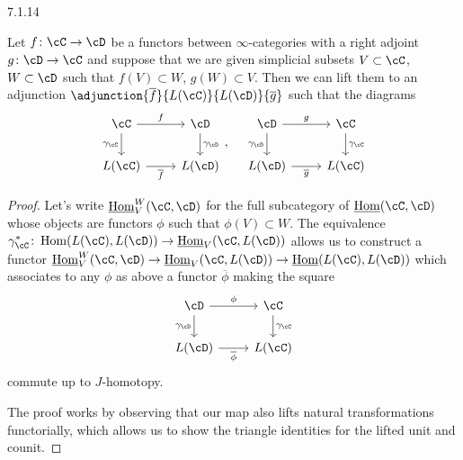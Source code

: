 \documentclass[a4paper,12pt]{scrartcl}
\begin{document}
\begin{prop}\label{7114}
  7.1.14

  Let $f\colon\cC\rightarrow\cD$ be a functors between $\infty$-categories with
  a right adjoint $g\colon\cD\rightarrow\cC$ and suppose that we are given
  simplicial subsets $V\subset\cC$, $W\subset\cD$ such that $f(V)\subset W$,
  $g(W)\subset V$. Then we can lift them to an adjunction
  $\adjunction{\overline{f}}{L(\cC)}{L(\cD)}{\overline{g}}$ such that the
  diagrams
  \[\begin{tikzcd}
    \cC & \cD \\
    {L(\cC)} & {L(\cD)}
    \arrow["{\gamma_\cD}", from=1-2, to=2-2]
    \arrow["{\gamma_\cC}"', from=1-1, to=2-1]
    \arrow["{\overline{f}}"', from=2-1, to=2-2]
    \arrow["f", from=1-1, to=1-2]
  \end{tikzcd},
  \quad
  \begin{tikzcd}
    \cD & \cC \\
    {L(\cD)} & {L(\cC)}
    \arrow["{\gamma_\cC}", from=1-2, to=2-2]
    \arrow["{\gamma_\cD}"', from=1-1, to=2-1]
    \arrow["{\overline{g}}"', from=2-1, to=2-2]
    \arrow["g", from=1-1, to=1-2]
  \end{tikzcd}
  \]
\end{prop}
\begin{proof}
  Let's write $\Home_V^W(\cC,\cD)$ for the full subcategory of $\Home(\cC,\cD)$
  whose objects are functors $\phi$ such that $\phi(V)\subset W$. The
  equivalence
  $\gamma^*_\cC\colon\Hom(L(\cC),L(\cD))\rightarrow\Home_V(\cC,L(\cD))$ allows
  us to construct a functor
  $\Home^W_V(\cC,\cD)\rightarrow\Home_V(\cC,L(\cD))\rightarrow\Home(L(\cC),L(\cD))$
  which associates to any $\phi$ as above a functor $\overline{\phi}$ making the
  square
  \[\begin{tikzcd}
    \cD & \cC \\
    {L(\cD)} & {L(\cC)}
    \arrow["{\gamma_\cC}", from=1-2, to=2-2]
    \arrow["{\gamma_\cD}"', from=1-1, to=2-1]
    \arrow["{\overline{\phi}}"', from=2-1, to=2-2]
    \arrow["\phi", from=1-1, to=1-2]
  \end{tikzcd}\]
  commute up to $J$-homotopy.

  The proof works by observing that our map also lifts natural transformations
  functorially, which allows us to show the triangle identities for the lifted
  unit and counit.
\end{proof}
\end{document}
